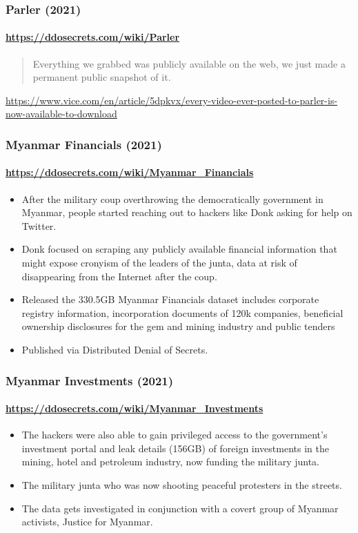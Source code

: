 \documentclass[aspectratio=169,usenames,dvipsnames]{beamer}
\begin{document}
\begin{frame}[c]
  \frametitle{Parler (2021)}
  \framesubtitle{\url{https://ddosecrets.com/wiki/Parler}}

  \begin{quote}
    Everything we grabbed was publicly available on the web, we just made a
    permanent public snapshot of it.
  \end{quote}

  \vspace{5mm}
  \centering
  \footnotesize
  \url{https://www.vice.com/en/article/5dpkvx/every-video-ever-posted-to-parler-is-now-available-to-download}

\end{frame}

\begin{frame}
  \frametitle{Myanmar Financials (2021)}
  \framesubtitle{\url{https://ddosecrets.com/wiki/Myanmar_Financials}}

  \begin{itemize}[<+->]
    \item After the military coup overthrowing the democratically government
      in Myanmar, people started reaching out to hackers like Donk asking for
      help on Twitter.
    \item Donk focused on scraping any publicly available financial
      information that might expose cronyism of the leaders of the
      junta, data at risk of disappearing from the Internet after the coup.
    \item Released the 330.5GB Myanmar Financials dataset includes corporate
      registry information, incorporation documents of 120k companies,
      beneficial ownership disclosures for the gem and mining industry and
      public tenders
    \item Published via Distributed Denial of Secrets.
  \end{itemize}

\end{frame}

\begin{frame}
  \frametitle{Myanmar Investments (2021)}
  \framesubtitle{\url{https://ddosecrets.com/wiki/Myanmar_Investments}}

  \begin{itemize}[<+->]
    \item The hackers were also able to gain privileged access to the
      government's investment portal and leak details (156GB) of foreign
      investments in the mining, hotel and petroleum industry, now
      funding the military junta.
    \item The military junta who was now shooting peaceful protesters in
      the streets.
    \item The data gets investigated in conjunction with a covert group of
      Myanmar activists, Justice for Myanmar.
  \end{itemize}
\end{frame}
\end{document}

